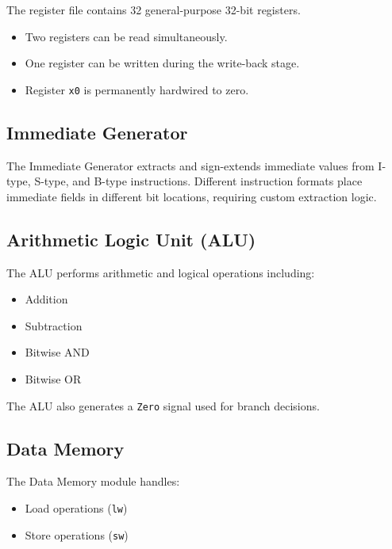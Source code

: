 \documentclass[10pt,a4paper,twocolumn]{article}
\begin{document}
The register file contains 32 general-purpose 32-bit registers.

\begin{itemize}
    \item Two registers can be read simultaneously.
    \item One register can be written during the write-back stage.
    \item Register \texttt{x0} is permanently hardwired to zero.
\end{itemize}

\subsection{Immediate Generator}

The Immediate Generator extracts and sign-extends immediate values from I-type, S-type, and B-type instructions. Different instruction formats place immediate fields in different bit locations, requiring custom extraction logic.

\subsection{Arithmetic Logic Unit (ALU)}

The ALU performs arithmetic and logical operations including:

\begin{itemize}
    \item Addition
    \item Subtraction
    \item Bitwise AND
    \item Bitwise OR
\end{itemize}

The ALU also generates a \texttt{Zero} signal used for branch decisions.

\subsection{Data Memory}

The Data Memory module handles:

\begin{itemize}
    \item Load operations (\texttt{lw})
    \item Store operations (\texttt{sw})
\end{itemize}
\end{document}
